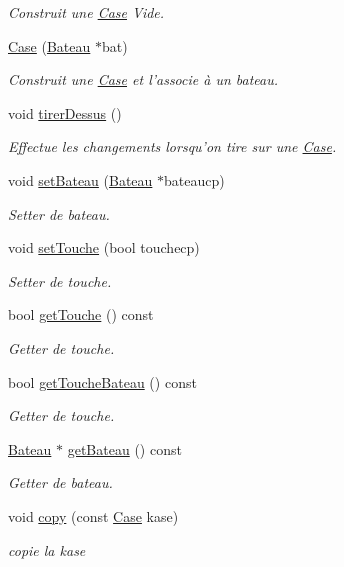 \begin{DoxyCompactItemize}
\begin{DoxyCompactList}\small\item\em Construit une \hyperlink{classCase}{Case} Vide. \end{DoxyCompactList}\item 
\hyperlink{classCase_a4fb5ed5f753f26b31708113796f90f6c}{Case} (\hyperlink{classBateau}{Bateau} $\ast$bat)
\begin{DoxyCompactList}\small\item\em Construit une \hyperlink{classCase}{Case} et l'associe à un bateau. \end{DoxyCompactList}\item 
void \hyperlink{classCase_a10683ff62deeb3399a4a114711fed1b3}{tirer\-Dessus} ()
\begin{DoxyCompactList}\small\item\em Effectue les changements lorsqu'on tire sur une \hyperlink{classCase}{Case}. \end{DoxyCompactList}\item 
void \hyperlink{classCase_a781dba42f3e38654f0c71a6c09f7309f}{set\-Bateau} (\hyperlink{classBateau}{Bateau} $\ast$bateaucp)
\begin{DoxyCompactList}\small\item\em Setter de bateau. \end{DoxyCompactList}\item 
void \hyperlink{classCase_a5c1554200c1146cdbfa7b02cd6105cc2}{set\-Touche} (bool touchecp)
\begin{DoxyCompactList}\small\item\em Setter de touche. \end{DoxyCompactList}\item 
bool \hyperlink{classCase_ac5aad4f4792af479f29617f2b420e1cd}{get\-Touche} () const 
\begin{DoxyCompactList}\small\item\em Getter de touche. \end{DoxyCompactList}\item 
bool \hyperlink{classCase_a30646f101d4f322ea48ef8a397bafa4a}{get\-Touche\-Bateau} () const 
\begin{DoxyCompactList}\small\item\em Getter de touche. \end{DoxyCompactList}\item 
\hyperlink{classBateau}{Bateau} $\ast$ \hyperlink{classCase_a70e3f95466100d7be6d737d9f53bd71b}{get\-Bateau} () const 
\begin{DoxyCompactList}\small\item\em Getter de bateau. \end{DoxyCompactList}\item 
void \hyperlink{classCase_a589d202f1c265145ab18258dbf0ce18b}{copy} (const \hyperlink{classCase}{Case} kase)
\begin{DoxyCompactList}\small\item\em copie la kase \end{DoxyCompactList}\end{DoxyCompactItemize}


